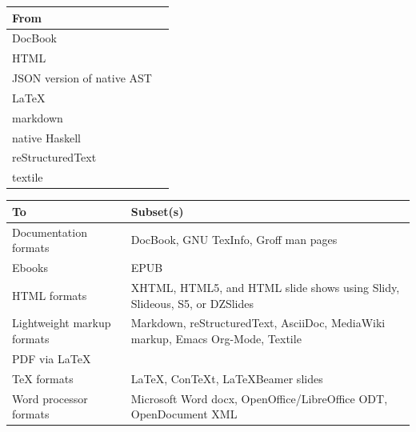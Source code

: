 \begin{footnotesize}\begin{tabularx}{130pt}{lX} \\
\hline
\textbf{From} \\
\hline
  DocBook \\
  HTML \\
  JSON version of native AST \\
  \LaTeX \\
  markdown \\
  native Haskell \\
  reStructuredText \\
  textile \\
\hline
\end{tabularx}\end{footnotesize}

\begin{footnotesize}\begin{tabularx}{\textwidth}{>{\hsize=0.4\hsize}X>{\hsize=0.7\hsize}X} \\
    \hline
    \textbf{To} & \textbf{Subset(s)} \\
    \hline
    Documentation formats & DocBook, GNU TexInfo, Groff man pages \\
    Ebooks & EPUB \\
    HTML formats & XHTML, HTML5, and HTML slide shows using Slidy, Slideous, S5, or DZSlides \\
    Lightweight markup formats & Markdown, reStructuredText, AsciiDoc, MediaWiki markup, Emacs Org-Mode, Textile \\
    PDF via \LaTeX \\
    TeX formats & \LaTeX, ConTeXt, \LaTeX Beamer slides \\
    Word processor formats & Microsoft Word docx, OpenOffice/LibreOffice ODT, OpenDocument XML \\
    \hline
  \end{tabularx}\end{footnotesize}


